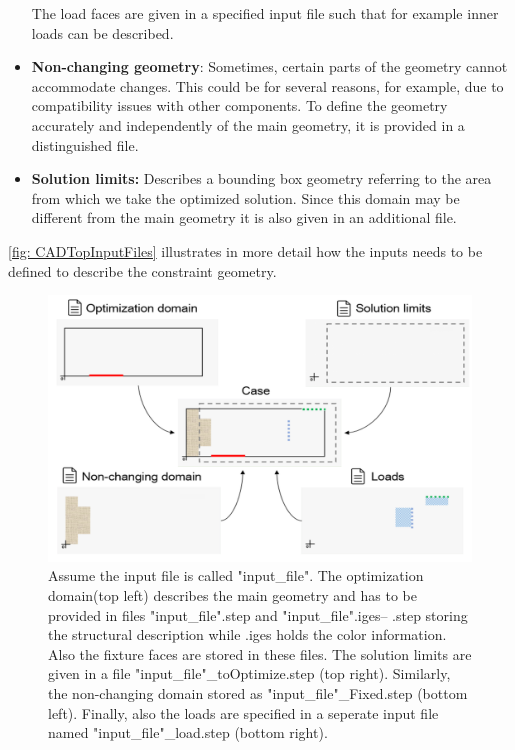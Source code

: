 \begin{itemize}
The load faces are given in a specified input file such that for example inner loads can be described.

	\item \textbf{Non-changing geometry}: Sometimes, certain parts of the geometry cannot accommodate changes. This could be for several reasons, for example, due to compatibility issues with other components. To define the geometry accurately and independently of the main geometry, it is provided in a distinguished file.%
	\item \textbf{Solution limits:} Describes a bounding box geometry referring to the area from which we take the optimized solution. Since this domain may be different from the main geometry it is also given in an additional file.
\end{itemize}

\autoref{fig: CADTopInputFiles} illustrates in more detail how the inputs needs to be defined to describe the constraint geometry. 

\begin{figure}[ht]
\includegraphics[width=\textwidth]{Pictures/four_files.png}
\caption{Assume the input file is called "input{\_}file". The optimization domain(top left) describes the main geometry and has to be provided in files "input{\_}file".step and "input{\_}file".iges-- .step storing the structural description while .iges holds the color information. Also the fixture faces are stored in these files. The solution limits are given in a file "input{\_}file"{\_}toOptimize.step (top right). Similarly, the non-changing domain stored as "input{\_}file"{\_}Fixed.step (bottom left). Finally, also the loads are specified in a seperate input file named "input{\_}file"{\_}load.step (bottom right).}
\label{fig: CADTopInputFiles}
\end{figure}
